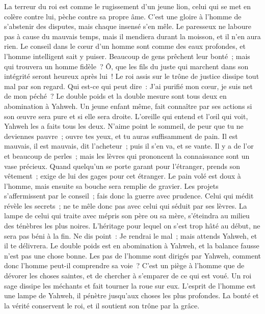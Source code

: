 \begin{multicols}{2}
La terreur du roi est comme le rugissement d'un jeune lion, celui qui se met en colère contre lui, pèche contre sa propre âme.
C'est une gloire à l'homme de s'abstenir des disputes, mais chaque insensé s'en mêle.
Le paresseux ne laboure pas à cause du mauvais temps, mais il mendiera durant la moisson, et il n'en aura rien.
Le conseil dans le cœur d'un homme sont comme des eaux profondes, et l'homme intelligent sait y puiser.
Beaucoup de gens prêchent leur bonté~; mais qui trouvera un homme fidèle~?
Ô, que les fils du juste qui marchent dans son intégrité seront heureux après lui~!
Le roi assis sur le trône de justice dissipe tout mal par son regard.
Qui est-ce qui peut dire~: J'ai purifié mon cœur, je suis net de mon péché~?
Le double poids et la double mesure sont tous deux en abomination à Yahweh.
Un jeune enfant même, fait connaître par ses actions si son œuvre sera pure et si elle sera droite.
L'oreille qui entend et l'œil qui voit, Yahweh les a faits tous les deux.
N'aime point le sommeil, de peur que tu ne deviennes pauvre~; ouvre tes yeux, et tu auras suffisamment de pain.
Il est mauvais, il est mauvais, dit l'acheteur~; puis il s'en va, et se vante.
Il y a de l'or et beaucoup de perles~; mais les lèvres qui prononcent la connaissance sont un vase précieux.
Quand quelqu'un se porte garant pour l'étranger, prends son vêtement~; exige de lui des gages pour cet étranger.
Le pain volé est doux à l'homme, mais ensuite sa bouche sera remplie de gravier.
Les projets s'affermissent par le conseil~; fais donc la guerre avec prudence.
Celui qui médit révèle les secrets~; ne te mêle donc pas avec celui qui séduit par ses lèvres.
La lampe de celui qui traite avec mépris son père ou sa mère, s'éteindra au milieu des ténèbres les plus noires.
L'héritage pour lequel on s'est trop hâté au début, ne sera pas béni à la fin.
Ne dis point~: Je rendrai le mal~; mais attends Yahweh, et il te délivrera.
Le double poids est en abomination à Yahweh, et la balance fausse n'est pas une chose bonne.
Les pas de l'homme sont dirigés par Yahweh, comment donc l'homme peut-il comprendre sa voie~?
C'est un piège à l'homme que de dévorer les choses saintes, et de chercher à s'emparer de ce qui est voué.
Un roi sage dissipe les méchants et fait tourner la roue sur eux.
L'esprit de l'homme est une lampe de Yahweh, il pénètre jusqu'aux choses les plus profondes.
La bonté et la vérité conservent le roi, et il soutient son trône par la grâce.

\end{multicols}
